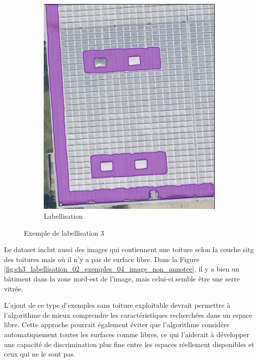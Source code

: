\begin{figure}[H]
\begin{subfigure}[b]{0.49\textwidth}
        \includegraphics[width=\textwidth]{02-main/figures/ch3/ch3_labellisation_02_exemples_03_solaire2.png}
        \caption{Labellisation}
        \label{fig:ch3_labellisation_02_exemples_03_solaire2}
    \end{subfigure}
    \caption{Exemple de labellisation 3}
    \label{fig:labellisation_solaire_exemple}
\end{figure}

Le dataset inclut aussi des images qui contiennent une toiture selon la couche \acrshort{sitg} des toitures mais où il n'y a pas de surface libre. Dans la Figure \ref{fig:ch3_labellisation_02_exemples_04_image_non_annotee}, il y a bien un bâtiment dans la zone nord-est de l'image, mais celui-ci semble être une serre vitrée.

L'ajout de ce type d'exemples sans toiture exploitable devrait permettre à l'algorithme de mieux comprendre les caractéristiques recherchées dans un espace libre. Cette approche pourrait également éviter que l'algorithme considère automatiquement toutes les surfaces comme libres, ce qui l'aiderait à développer une capacité de discrimination plus fine entre les espaces réellement disponibles et ceux qui ne le sont pas.

